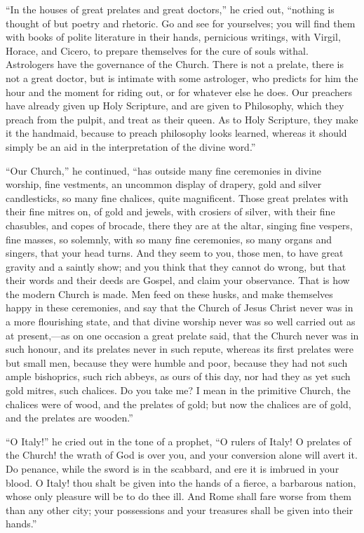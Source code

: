 ``In the houses of great prelates and great
doctors,'' he cried out, ``nothing is thought of
but poetry and rhetoric. Go and see for yourselves; you
will find them with books of polite literature in their
hands, pernicious writings, with Virgil, Horace, and
Cicero, to prepare themselves for the cure of souls
withal. Astrologers have the governance of the Church.
There is not a prelate, there is not a great doctor, but
is intimate with some astrologer, who predicts for him
the hour and the moment for riding out, or for whatever
else he does. Our preachers have already given up Holy
Scripture, and are given to Philosophy, which they preach
from the pulpit, and treat as their queen. As to Holy
Scripture, they make it the handmaid, because to preach
philosophy looks learned, whereas it should simply be an
aid in the interpretation of the divine word.''

``Our Church,'' he continued, ``has
outside many fine ceremonies in divine worship, fine
vestments, an uncommon display of drapery, gold and
silver candlesticks, so many fine chalices, quite
magnificent. Those great prelates with their fine mitres
on, of gold and jewels, with crosiers of silver, with
their fine chasubles, and copes of brocade, there they
are at the altar, singing fine vespers, fine masses, so
solemnly, with so many fine ceremonies, so many organs
and singers, that your head turns. And they seem to you,
those men, to have great gravity and a saintly show; and
you think that they cannot do wrong, but that their words
and their deeds are Gospel, and claim your observance.
That is how the modern Church is made. Men feed on these
husks, and make themselves happy in these ceremonies, and
say that the Church of Jesus Christ never was in a more
flourishing state, and that divine worship never was so
well carried out as at present,—as on one occasion a
great prelate said, that the Church never was in such
honour, and its prelates never in such repute, whereas
its first prelates were but small men, because they were
humble and poor, because they had not such ample
bishoprics, such rich abbeys, as ours of this day, nor
had they as yet such gold mitres, such chalices. Do you
take me? I mean in the primitive Church, the chalices
were of wood, and the prelates of gold; but now the
chalices are of gold, and the prelates are wooden.''

``O Italy!'' he cried out in the tone of a
prophet, ``O rulers of Italy! O prelates of the
Church! the wrath of God is over you, and your conversion
alone will avert it. Do penance, while the sword is in
the scabbard, and ere it is imbrued in your blood. O
Italy! thou shalt be given into the hands of a fierce, a
barbarous nation, whose only pleasure will be to do thee
ill. And Rome shall fare worse from them than any other
city; your possessions and your treasures shall be given
into their hands.''

